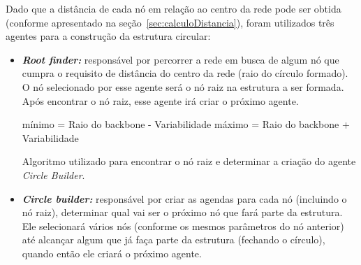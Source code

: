 Dado que a distância de cada nó em relação ao centro da rede pode ser obtida (conforme apresentado na seção~\ref{sec:calculoDistancia}), foram utilizados três agentes para a construção da estrutura circular: 

\begin{itemize}
 \item \textbf{\emph{Root finder:}} responsável por percorrer a rede em busca de algum nó que cumpra o requisito de distância do centro da rede (raio do círculo formado). O nó selecionado por esse agente será o nó raiz na estrutura a ser formada. Após encontrar o nó raiz, esse agente irá criar o próximo agente. 

 \begin{algorithm}[H]
	

	mínimo = Raio do backbone - Variabilidade\;
	máximo = Raio do backbone + Variabilidade\;
	
	
\caption{Algoritmo utilizado para encontrar o nó raiz e determinar a criação do agente \emph{Circle Builder}.}
\end{algorithm}
 
 \item \textbf{\emph{Circle builder:}} responsável por criar as agendas para cada nó (incluindo o nó raiz), determinar qual vai ser o próximo nó que fará parte da estrutura. Ele selecionará vários nós (conforme os mesmos parâmetros do nó anterior) até alcançar algum que já faça parte da estrutura (fechando o círculo), quando então ele criará o próximo agente.

\begin{algorithm}[H]
	

\end{algorithm}
\end{itemize}

